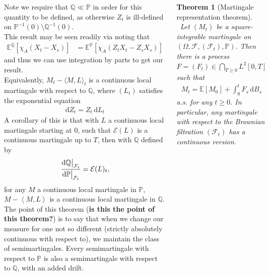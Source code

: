 \documentclass{tikzposter} %
\newcommand{\diff}{\mathrm{d}}
\newcommand\E[1]{\mathbb{E}\left[ #1 \right]}
\newcommand{\mc}{\mathcal}
\newcommand\qvar[1]{\left\langle #1 \right\rangle}
\newcommand\restr[2]{{%
  \left.\kern-\nulldelimiterspace %
  #1 %
  \vphantom{\big|} %
  \right|_{#2} %
  }}
\newtheorem{theorem}{Theorem}
\begin{document}
\begin{columns}
{    Note we require that $\mathbb{Q} \ll \mathbb{P}$ in order for this quantity to be defined, as otherwise $Z_t$ is ill-defined on $\mathbb{P}^{-1}(0) \setminus \mathbb{Q}^{-1}(0)$.  \\

    This result may be seen readily via noting that
    \begin{align*}
      \mathbb{E}^{\mathbb{Q}}\left[\chi_A (X_t - X_s)\right] &= \mathbb{E}^{\mathbb{P}}\left[\chi_A (Z_t X_t - Z_s X_s)\right]
    \end{align*}
    and thus we can use integration by parts to get our result. \\

    Equivalently, $M_t - \langle M, L \rangle_t$ is a continuous local martingale with respect to $\mathbb{Q}$, where $(L_t)$ satisfies the exponential equation
    \begin{align*}
      \diff Z_t = Z_t \,\diff L_t
    \end{align*}
    A corollary of this is that with $L$ a continuous local martingale starting at $0$, such that $\mathcal{E}(L)$ is a continuous martingale up to $T$, then with $\mathbb{Q}$ defined by
    \begin{align*}
      \frac{\diff \restr{\mathbb{Q}}{\mc{F}_t}}{\diff \restr{\mathbb{P}}{\mc{F}_t}} = \mc{E}(L)_t,
    \end{align*}
    for any $M$ a continuous local martingale in $\mathbb{P}$, $M - \qvar{M, L}$ is a continuous local martingale in $\mathbb{Q}$. \\

    The point of this theorem (\textbf{is this the point of this theorem?}) is to say that when we change our measure for one not so different (strictly absolutely continuous with respect to), we maintain the class of semimartingales. Every semimartingale with respect to $\mathbb{P}$ is also a semimartingale with respect to $\mathbb{Q}$, with an added drift. \\

    \begin{theorem}[Martingale representation theorem]
    \ Let $(M_t)$ be a square-integrable martingale on $(\Omega, \mc{F}, (\mc{F}_t), \mathbb{P})$. Then there is a process $F = (F_t) \in \bigcap_{T \ge 0} L^2[0, T]$ such that
    \begin{align*}
      M_t = \E{M_0} + \int_0^t F_s \, \diff B_s
    \end{align*}
    a.s. for any $t \ge 0$. In particular, any martingale with respect to the Brownian filtration $(\mc{F}_t)$ has a continuous version.
    \end{theorem}
    \hphantom{}

}
\end{columns}
\end{document}
